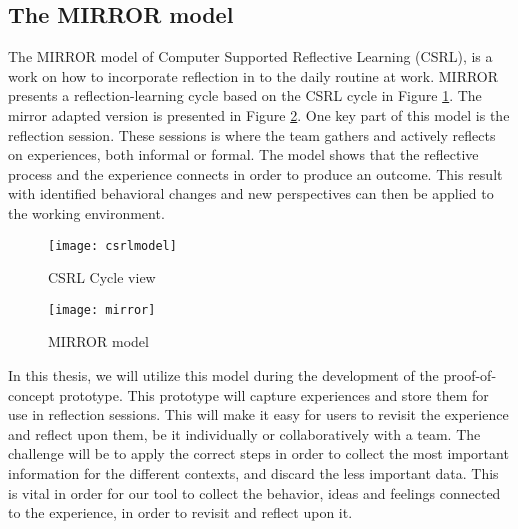 \subsection{The MIRROR model}
\label{mirrorsection}
The MIRROR model of Computer Supported Reflective Learning (CSRL), is a work on how to incorporate reflection in to the daily routine at work.
MIRROR presents a reflection-learning cycle based on the CSRL cycle in Figure \ref{csrlmodel}. The mirror adapted version is presented in Figure \ref{mirrormodel}. One key part of this model is the reflection session. These sessions is where the team gathers and actively reflects on experiences, both informal or formal. The model shows that the reflective process and the experience connects in order to produce an outcome. This result with identified behavioral changes and new perspectives can then be applied to the working environment. 
\begin{figure}[!htpb]
\label{csrlmodel}
\centering
	\texttt{[image: csrlmodel]}
\caption{CSRL Cycle view}
\end{figure}

\begin{figure}[!htpb]
\centering
	\texttt{[image: mirror]}
\caption{MIRROR model}
\label{mirrormodel}
\end{figure}


In this thesis, we will utilize this model during the development of the proof-of-concept prototype. This prototype will capture experiences and store them for use in reflection sessions. This will make it easy for users to revisit the experience and reflect upon them, be it individually or collaboratively with a team. The challenge will be to apply the correct steps in order to collect the most important information for the different contexts, and discard the less important data. This is vital in order for our tool to collect the behavior, ideas and feelings connected to the experience, in order to revisit and reflect upon it. 
\clearpage





